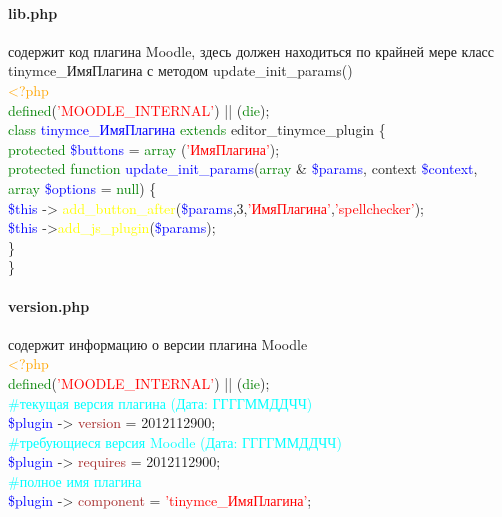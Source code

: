 \documentclass[14pt,Diplom]{diplomwork}
\begin{document}
\paragraph{lib.php}
содержит код плагина Moodle, здесь должен находиться по крайней мере класс tinymce\_ИмяПлагина с методом update\_init\_params()\\
 \textcolor{orange}{<?php} \\
 \textcolor{green}{defined}(\textcolor{red}{'MOODLE\_INTERNAL'}) || (\textcolor{green}{die});\\
 
\textcolor{green}{class} \textcolor{blue}{tinymce\_ИмяПлагина} \textcolor{green}{extends} editor\_tinymce\_plugin \{ \\
\textcolor{green}{protected} \textcolor{blue}{\$buttons} = \textcolor{green}{array} (\textcolor{red}{'ИмяПлагина'}); \\

\textcolor{green}{protected function} \textcolor{blue}{update\_init\_params}(\textcolor{green}{array} \& \textcolor{blue}{\$params}, context \textcolor{blue}{\$context}, \textcolor{green}{array} \textcolor{blue}{\$options} = \textcolor{green}{null}) \{ \\

\textcolor{blue}{\$this} -> \textcolor{yellow}{add\_button\_after}(\textcolor{blue}{\$params},3,\textcolor{red}{'ИмяПлагина'},\textcolor{red}{'spellchecker'});\\

\textcolor{blue}{\$this} ->\textcolor{yellow}{add\_js\_plugin}(\textcolor{blue}{\$params});\\

 \}\\
\}\\


 \paragraph{version.php}
 содержит информацию о версии плагина Moodle\\
  \textcolor{orange}{<?php} \\
 \textcolor{green}{defined}(\textcolor{red}{'MOODLE\_INTERNAL'}) || (\textcolor{green}{die});\\
 \textcolor{cyan}{\#текущая версия плагина (Дата: ГГГГММДДЧЧ)}\\
 \textcolor{blue}{\$plugin} -> \textcolor{brown}{version} = 2012112900; \\
 \textcolor{cyan}{\#требующиеся версия Moodle (Дата: ГГГГММДДЧЧ)}\\
 \textcolor{blue}{\$plugin} -> \textcolor{brown}{requires} = 2012112900; \\
 \textcolor{cyan}{\#полное имя плагина}\\
 \textcolor{blue}{\$plugin} -> \textcolor{brown}{component} = \textcolor{red}{'tinymce\_ИмяПлагина'}; \\
 
\end{document}
